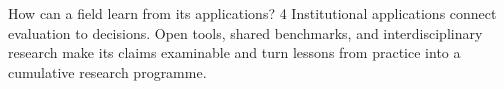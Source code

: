 \def\BookPartTitle{Applications and Disciplinary Development}
{How can a field learn from its applications?}
{4}
{Institutional applications connect evaluation to decisions. Open tools, shared benchmarks, and interdisciplinary research make its claims examinable and turn lessons from practice into a cumulative research programme.}
{
}

